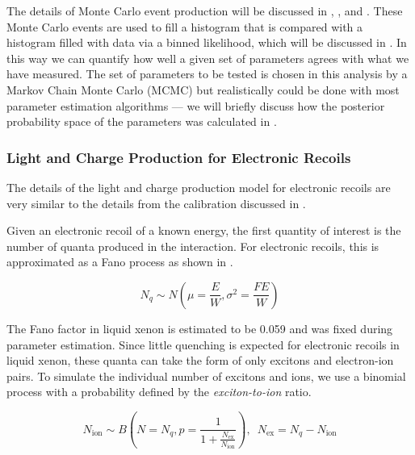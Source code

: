 The details of Monte Carlo event production will be discussed in , , and .  These Monte Carlo events are used to fill a histogram that is compared with a histogram filled with data via a binned likelihood, which will be discussed in .  In this way we can quantify how well a given set of parameters agrees with what we have measured.  The set of parameters to be tested is chosen in this analysis by a Markov Chain Monte Carlo (MCMC) but realistically could be done with most parameter estimation algorithms --- we will briefly discuss how the posterior probability space of the parameters was calculated in .
 

\subsubsection{Light and Charge Production for Electronic Recoils}
\label{sec:xe1t_mc_observables_production_er}

The details of the light and charge production model for electronic recoils are very similar to the details from the calibration discussed in .  

Given an electronic recoil of a known energy, the first quantity of interest is the number of quanta produced in the interaction.  For electronic recoils, this is approximated as a Fano process as shown in .

\begin{equation}
        \label{eqn:xe1t_er_fano}
        N_q \sim N \left( \mu = \frac{E}{W}, \sigma^2 = \frac{F E}{W} \right) 
\end{equation}

The Fano factor in liquid xenon is estimated to be 0.059 \cite{doke1976estimation} and was fixed during parameter estimation.  Since little quenching is expected for electronic recoils in liquid xenon, these quanta can take the form of only excitons and electron-ion pairs.   To simulate the individual number of excitons and ions, we use a binomial process with a probability defined by the \textit{exciton-to-ion} ratio.


\begin{equation}
        \label{eqn:xe1t_er_exciton_ion}
        N_{\textrm{ion}} \sim B \left( N=N_q, p = \frac{1}{1 + \frac{N_{\textrm{ex}}}{N_{\textrm{ion}}}} \right) , \, \, \, N_{\textrm{ex}} = N_q - N_{\textrm{ion}}
\end{equation}


